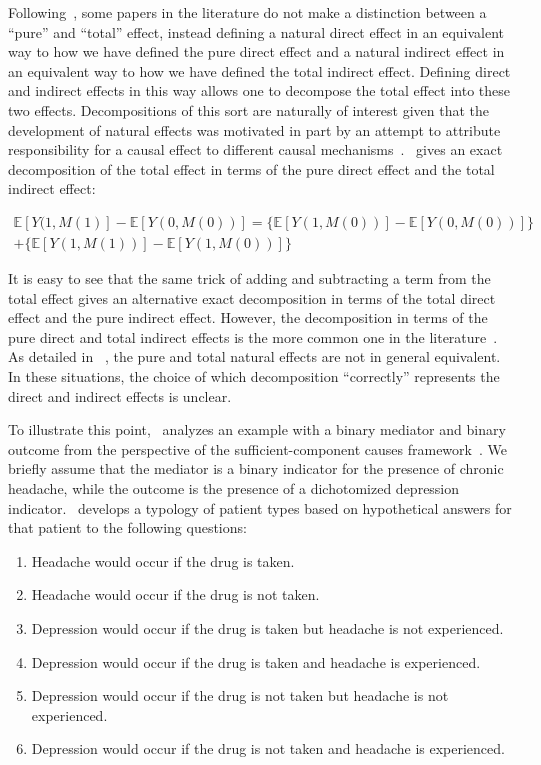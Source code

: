 Following~\cite{pearl2001}, some papers in the literature do not make a distinction between a ``pure'' and ``total''
effect, instead defining a natural direct effect in an equivalent way to how we have defined the 
pure direct effect and a natural indirect effect in an equivalent way to how we have defined the total indirect effect.
Defining direct and indirect effects in this way allows one to decompose the total effect into these two effects. 
Decompositions of this sort are naturally of interest given that the development of natural effects was motivated 
in part by an attempt to attribute 
responsibility for a causal effect to different causal mechanisms~\citep{pearl2001}.~\cite{pearl2001} gives an exact 
decomposition of the total effect in terms of the pure direct effect and the total indirect effect:

\begin{equation}
\begin{aligned}
	\mathbb{E}[Y(1,M(1)] - \mathbb{E}[Y(0,M(0))] = 
	\{\mathbb{E}[Y(1,M(0))] - \mathbb{E}[Y(0,M(0))]\}\\ 
	+ \{\mathbb{E}[Y(1,M(1))] - \mathbb{E}[Y(1,M(0))]\}
\end{aligned}
\end{equation}

It is easy to see that the same trick of adding and subtracting a term from the total effect gives an alternative
exact decomposition in terms of the total direct effect and the pure indirect effect. However, the decomposition
in terms of the pure direct and total indirect effects is the more common one in the literature~\citep{vanderweele2014}. 
As detailed in
~\cite{robinsgreenland1992}, the pure and total natural effects are not in general equivalent. In these situations, 
the choice of which decomposition ``correctly'' represents the direct and indirect effects is unclear.

To illustrate this point,~\cite{robinsgreenland1992} analyzes an example with a binary mediator and binary
outcome from the perspective of the sufficient-component causes framework~\citep{rothman1976}. We briefly assume 
that the mediator is a binary indicator for the presence of chronic headache, while
the outcome is the presence of a dichotomized depression indicator.~\cite{robinsgreenland1992} develops a typology
of patient types based on hypothetical answers for that patient to the following questions:

\begin{enumerate}[noitemsep,topsep=0pt]
\item Headache would occur if the drug is taken.
\item Headache would occur if the drug is not taken.
\item Depression would occur if the drug is taken but headache is not experienced.
\item Depression would occur if the drug is taken and headache is experienced.
\item Depression would occur if the drug is not taken but headache is not experienced.
\item Depression would occur if the drug is not taken and headache is experienced.
\end{enumerate}

